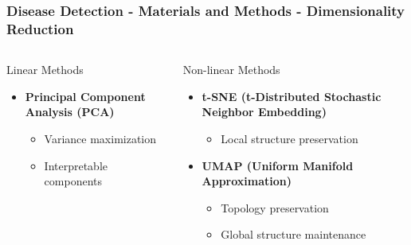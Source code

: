 \documentclass[aspectratio=43]{beamer}
\begin{document}
\begin{frame}
    \frametitle{\small Disease Detection - Materials and Methods - Dimensionality Reduction}
    
    \begin{columns}
        \begin{column}{0.5\textwidth}
            \begin{block}{Linear Methods}
                \begin{itemize}
                    \item \textbf{Principal Component Analysis (PCA)}
                        \begin{itemize}
                            \item Variance maximization
                            \item Interpretable components
                        \end{itemize}
                \end{itemize}
            \end{block}
        \end{column}
        
        \begin{column}{0.5\textwidth}
            \begin{block}{Non-linear Methods}
                \begin{itemize}
                    \item \textbf{t-SNE (t-Distributed Stochastic Neighbor Embedding)}
                        \begin{itemize}
                            \item Local structure preservation
                        \end{itemize}
                    \item \textbf{UMAP (Uniform Manifold Approximation)}
                        \begin{itemize}
                            \item Topology preservation
                            \item Global structure maintenance
                        \end{itemize}
                \end{itemize}
            \end{block}
        \end{column}
    \end{columns}
\end{frame}
\end{document}

